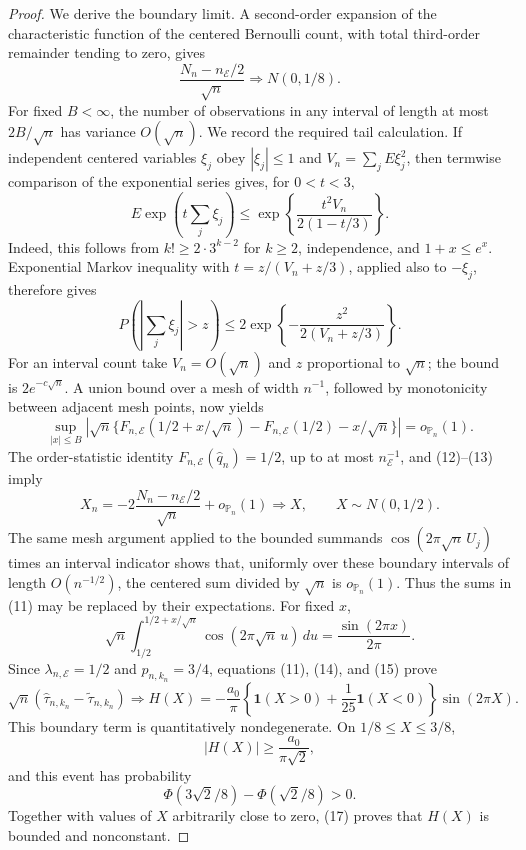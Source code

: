 \documentclass{article}
\begin{document}
\begin{proof}
We derive the boundary limit.  A second-order expansion of the characteristic function of the centered Bernoulli count, with total third-order remainder tending to zero, gives
\[
 \frac{N_n-n_{\mathcal E}/2}{\sqrt n}\Rightarrow N(0,1/8).
\tag{12}
\]
For fixed \(B<\infty\), the number of observations in any interval of length at most \(2B/\sqrt n\) has variance \(O(\sqrt n)\).  We record the required tail calculation.  If independent centered variables \(\xi_j\) obey \(|\xi_j|\leq1\) and \(V_n=\sum_jE\xi_j^2\), then termwise comparison of the exponential series gives, for \(0<t<3\),
\[
 E\exp\!\left(t\sum_j\xi_j\right)
 \leq\exp\!\left\{\frac{t^2V_n}{2(1-t/3)}\right\}.
\]
Indeed, this follows from \(k!\geq2\cdot3^{k-2}\) for \(k\geq2\), independence, and \(1+x\leq e^x\).  Exponential Markov inequality with \(t=z/(V_n+z/3)\), applied also to \(-\xi_j\), therefore gives
\[
 P\!\left(\left|\sum_j\xi_j\right|>z\right)
 \leq2\exp\!\left\{-\frac{z^2}{2(V_n+z/3)}\right\}.
\]
For an interval count take \(V_n=O(\sqrt n)\) and \(z\) proportional to \(\sqrt n\); the bound is \(2e^{-c\sqrt n}\).  A union bound over a mesh of width \(n^{-1}\), followed by monotonicity between adjacent mesh points, now yields
\[
 \sup_{|x|\leq B}\left|
 \sqrt n\{F_{n,\mathcal E}(1/2+x/\sqrt n)
 -F_{n,\mathcal E}(1/2)-x/\sqrt n\}
 \right|=o_{\mathbb P_n}(1).
\tag{13}
\]
The order-statistic identity \(F_{n,\mathcal E}(\widehat q_n)=1/2\), up to at most \(n_{\mathcal E}^{-1}\), and (12)--(13) imply
\[
 X_n=-2\frac{N_n-n_{\mathcal E}/2}{\sqrt n}+o_{\mathbb P_n}(1)
 \Rightarrow X,
 \qquad X\sim N(0,1/2).
\tag{14}
\]
The same mesh argument applied to the bounded summands \(\cos(2\pi\sqrt n\,U_j)\) times an interval indicator shows that, uniformly over these boundary intervals of length \(O(n^{-1/2})\), the centered sum divided by \(\sqrt n\) is \(o_{\mathbb P_n}(1)\).  Thus the sums in (11) may be replaced by their expectations.  For fixed \(x\),
\[
 \sqrt n\int_{1/2}^{1/2+x/\sqrt n}
 \cos(2\pi\sqrt n\,u)\,du
 =\frac{\sin(2\pi x)}{2\pi}.
\tag{15}
\]
Since \(\lambda_{n,\mathcal E}=1/2\) and \(p_{n,k_n}=3/4\), equations (11), (14), and (15) prove
\[
 \sqrt n(\widehat\tau_{n,k_n}-\widetilde\tau_{n,k_n})
 \Rightarrow
 H(X)=-\frac{a_0}{\pi}
 \left\{\mathbf1(X>0)+\frac1{25}\mathbf1(X<0)\right\}
 \sin(2\pi X).
\tag{16}
\]
This boundary term is quantitatively nondegenerate.  On \(1/8\leq X\leq3/8\),
\[
 |H(X)|\geq\frac{a_0}{\pi\sqrt2},
\]
and this event has probability
\[
 \Phi(3\sqrt2/8)-\Phi(\sqrt2/8)>0.
\tag{17}
\]
Together with values of \(X\) arbitrarily close to zero, (17) proves that \(H(X)\) is bounded and nonconstant.


\end{proof}
\end{document}
